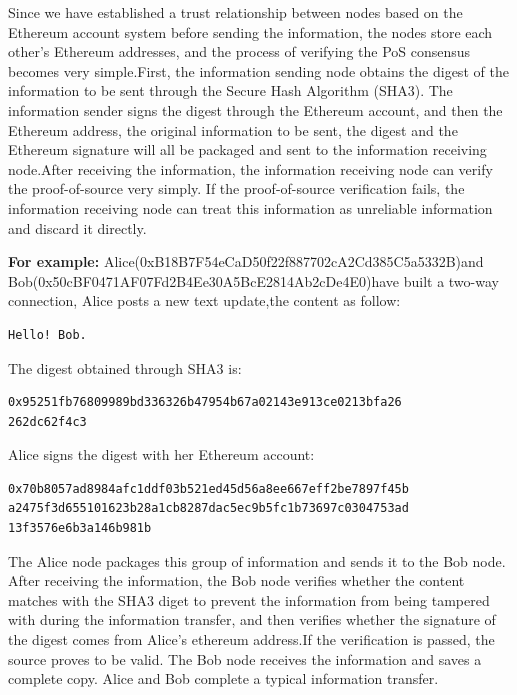\documentclass{article}
\begin{document}
    Since we have established a trust relationship between nodes based on the Ethereum account system before sending the information, the nodes store each other's Ethereum addresses, and the process of verifying the PoS consensus becomes very simple.First, the information sending node obtains the digest of the information to be sent through the Secure Hash Algorithm (SHA3). The information sender signs the digest through the Ethereum account, and then the Ethereum address, the original information to be sent, the digest and the Ethereum signature will all be packaged and  sent to the information receiving node.After receiving the information, the information receiving node can verify the proof-of-source very simply. If the proof-of-source verification fails, the information receiving node can treat this information as unreliable information and discard it directly.
    ~\newline
    \begin{blockqt}
    \textbf{For example: }Alice(0xB18B7F54eCaD50f22f887702cA2Cd385C5a5332B)and Bob(0x50cBF0471AF07Fd2B4Ee30A5BcE2814Ab2cDe4E0)have built a two-way connection, Alice posts a new text update,the content as follow: 
    
    \begin{lstlisting}[caption=Message from Alice, numbers=none]
Hello! Bob.
    \end{lstlisting}
    The digest obtained through SHA3 is:
    \begin{lstlisting}[caption=SHA3 digest of message, numbers=none, breaklines=true]
0x95251fb76809989bd336326b47954b67a02143e913ce0213bfa26
262dc62f4c3
    \end{lstlisting}
    Alice signs the digest with her Ethereum account:
    \begin{lstlisting}[caption=Signature, numbers=none]
0x70b8057ad8984afc1ddf03b521ed45d56a8ee667eff2be7897f45b
a2475f3d655101623b28a1cb8287dac5ec9b5fc1b73697c0304753ad
13f3576e6b3a146b981b
    \end{lstlisting}
    The Alice  node packages this group of information and sends it to the Bob node. After receiving the information, the Bob node verifies whether the content matches with the SHA3 diget to prevent the information from being tampered with during the information transfer, and then verifies whether the signature of the digest comes from Alice's ethereum address.If the verification is passed, the source proves to be valid. The Bob node receives the information and saves a complete copy. Alice and Bob complete a typical information transfer.
    \end{blockqt}
\end{document}
